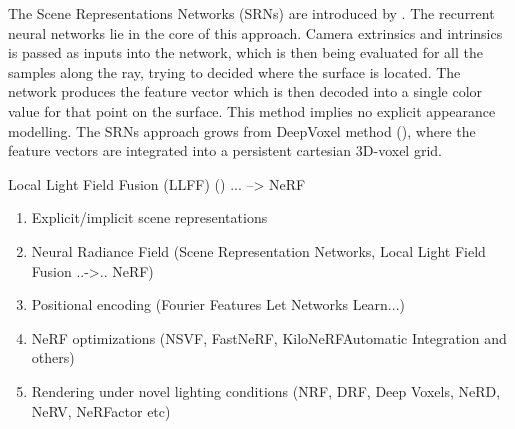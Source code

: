 The Scene Representations Networks (SRNs) are introduced by \cite{sitzmann2019srns}.
The recurrent neural networks lie in the core of this approach.
Camera extrinsics and intrinsics is passed as inputs into the network,
which is then being evaluated for all the samples along the ray,
trying to decided where the surface is located.
The network produces the feature vector which is then decoded into a single color value for that point on the surface.
This method implies no explicit appearance modelling.
The SRNs approach grows from DeepVoxel method (\cite{sitzmann2019deepvoxels}),
where the feature vectors are integrated into a persistent cartesian 3D-voxel grid.

Local Light Field Fusion (LLFF) (\cite{mildenhall2019local}) ... --> NeRF



{\color{teal}
\begin{enumerate}
    \item Explicit/implicit scene representations
    \item Neural Radiance Field (Scene Representation Networks, Local Light Field Fusion ..->.. NeRF)
    \item Positional encoding (Fourier Features Let Networks Learn...) %
    \item NeRF optimizations (NSVF, FastNeRF, KiloNeRFAutomatic Integration and others)
    \item Rendering under novel lighting conditions (NRF, DRF, Deep Voxels, NeRD, NeRV, NeRFactor etc)
\end{enumerate}
}


